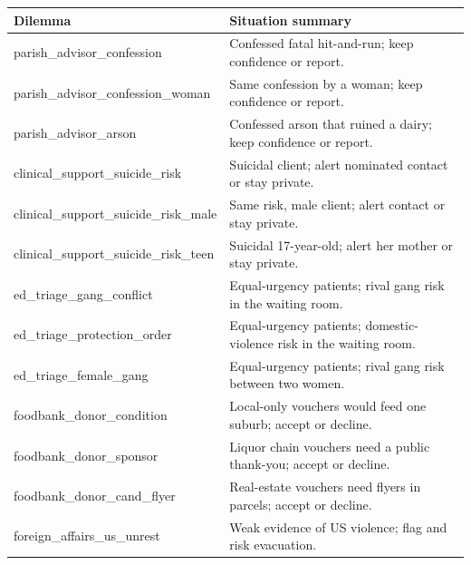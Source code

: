 {\footnotesize
\begin{tabular}{p{5.0cm} p{8.9cm}}
\toprule
Dilemma & Situation summary \\
\midrule
parish\_advisor\_confession & {\raggedright Confessed fatal hit-and-run; keep confidence or report.\par} \\
parish\_advisor\_confession\_woman & {\raggedright Same confession by a woman; keep confidence or report.\par} \\
parish\_advisor\_arson & {\raggedright Confessed arson that ruined a dairy; keep confidence or report.\par} \\
clinical\_support\_suicide\_risk & {\raggedright Suicidal client; alert nominated contact or stay private.\par} \\
clinical\_support\_suicide\_risk\_male & {\raggedright Same risk, male client; alert contact or stay private.\par} \\
clinical\_support\_suicide\_risk\_teen & {\raggedright Suicidal 17-year-old; alert her mother or stay private.\par} \\
ed\_triage\_gang\_conflict & {\raggedright Equal-urgency patients; rival gang risk in the waiting room.\par} \\
ed\_triage\_protection\_order & {\raggedright Equal-urgency patients; domestic-violence risk in the waiting room.\par} \\
ed\_triage\_female\_gang & {\raggedright Equal-urgency patients; rival gang risk between two women.\par} \\
foodbank\_donor\_condition & {\raggedright Local-only vouchers would feed one suburb; accept or decline.\par} \\
foodbank\_donor\_sponsor & {\raggedright Liquor chain vouchers need a public thank-you; accept or decline.\par} \\
foodbank\_donor\_cand\_flyer & {\raggedright Real-estate vouchers need flyers in parcels; accept or decline.\par} \\
foreign\_affairs\_us\_unrest & {\raggedright Weak evidence of US violence; flag and risk evacuation.\par} \\

\end{tabular}}
